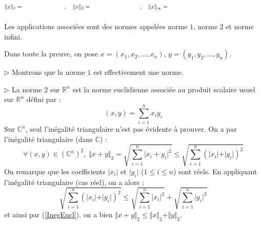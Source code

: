 \documentclass[a4paper,10pt]{report}
\begin{document}
$$\Vert x \Vert_1  = \phantom{\dis \sum_{i=1}^n \vert x_i \vert} \qquad, \quad \Vert x \Vert_2  = \phantom{\dis \sqrt{\sum_{i=1}^n \vert x_i \vert^2 }} \qquad, \quad \Vert x \Vert_{\infty}  = \phantom{\sup_{i \in \Interv{1}{n}} \vert x_i \vert = \max_{i \in \Interv{1}{n}} \vert x_i \vert }$$
Les applications associées sont des normes appelées norme $1$, norme $2$ et norme infini.

\medskip

\begin{preuve} Dans toute la preuve, on pose $x=(x_1, x_2, \ldots, x_n)$, $y=(y_1, y_2, \ldots,y_n)$.

\medskip

\noindent $\rhd$ Montrons que la norme $1$ est effectivement une norme. 


\vspace{11cm}
%

\noindent $\rhd$ La norme $2$ sur $\mathbb{R}^n$ est la norme euclidienne associée au produit scalaire usuel sur $\mathbb{R}^n$ défini par :
$$ (x,y) = \sum_{i=1}^n x_i y_i $$
Sur $\mathbb{C}^n$, seul l'inégalité triangulaire n'est pas évidente à prouver. On a par l'inégalité triangulaire (dans $\mathbb{C}$) :
\begin{equation}\label{InegEucl} \forall (x,y) \in (\mathbb{C}^n)^2, \; \Vert x+y \Vert_2 =  \sqrt{\sum_{i=1}^n \vert x_i+y_i \vert^2} \leq \sqrt{\sum_{i=1}^n (\vert x_i \vert + \vert y_i \vert)^2}
\end{equation}
On remarque que les coefficients $\vert x_i \vert$ et $\vert y_i \vert$ ($1 \leq i \leq n$) sont réels. En appliquant l'inégalité triangulaire (cas réel), on a alors :
$$ \sqrt{\sum_{i=1}^n (\vert x_i \vert + \vert y_i \vert)^2} \leq \sqrt{\sum_{i=1}^n \vert x_i \vert^2 } + \sqrt{\sum_{i=1}^n \vert y_i \vert^2 }$$
et ainsi par (\ref{InegEucl}), on a bien $\Vert x + y \Vert_2 \leq \Vert x  \Vert_2 + \Vert  y \Vert_2$.


\end{preuve}
\end{document}
